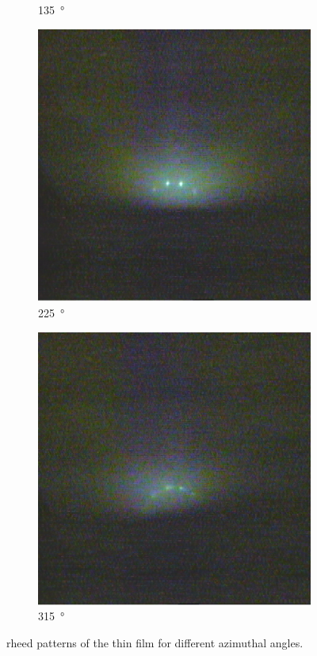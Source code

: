 \begin{figure}
\begin{subfigure}{0.2\linewidth}
        \caption{\qty{135}{\degree}}
    \end{subfigure}
    \begin{subfigure}{0.2\linewidth}
        \includegraphics[width=\textwidth]{../data/edited/1_2_232deg.pdf}
        \caption{\qty{225}{\degree}}
    \end{subfigure}
    \begin{subfigure}{0.2\linewidth}
        \includegraphics[width=\textwidth]{../data/edited/1_2_322deg.pdf}
        \caption{\qty{315}{\degree}}
    \end{subfigure}

    \caption{\ac{rheed} patterns of the  thin film for different azimuthal 
    angles.}
    \label{fig:rheed1}
\end{figure}

